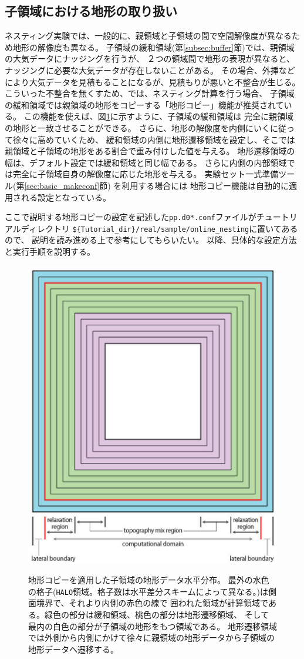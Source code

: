 \subsection{子領域における地形の取り扱い} \label{subsec:nest_topo}
ネスティング実験では、一般的に、親領域と子領域の間で空間解像度が異なるため地形の解像度も異なる。
子領域の緩和領域(第\ref{subsec:buffer}節)では、親領域の大気データにナッジングを行うが、
２つの領域間で地形の表現が異なると、ナッジングに必要な大気データが存在しないことがある。
その場合、外挿などにより大気データを見積もることになるが、見積もりが悪いと不整合が生じる。
%
こういった不整合を無くすため、\scalerm では、ネスティング計算を行う場合、
子領域の緩和領域では親領域の地形をコピーする「地形コピー」機能が推奨されている。
この機能を使えば、図\ref{fig_topocopy}に示すように、子領域の緩和領域は
完全に親領域の地形と一致させることができる。
さらに、地形の解像度を内側にいくに従って徐々に高めていくため、
緩和領域の内側に地形遷移領域を設定し、そこでは親領域と子領域の地形をある割合で重み付けした値を与える。
地形遷移領域の幅は、デフォルト設定では緩和領域と同じ幅である。
さらに内側の内部領域では完全に子領域自身の解像度に応じた地形を与える。
実験セット一式準備ツール(第\ref{sec:basic_makeconf}節) を利用する場合には
地形コピー機能は自動的に適用される設定となっている。


ここで説明する地形コピーの設定を記述した\verb|pp.d0*.conf|ファイルがチュートリアルディレクトリ
\verb|${Tutorial_dir}/real/sample/online_nesting|に置いてあるので、
説明を読み進める上で参考にしてもらいたい。
%
以降、具体的な設定方法と実行手順を説明する。


\begin{figure}[htb]
\begin{center}
  \includegraphics[width=0.4\hsize]{./figure/topo_copy.eps}\\
  \caption{地形コピーを適用した子領域の地形データ水平分布。
最外の水色の格子(\texttt{HALO}領域。格子数は水平差分スキームによって異なる。)は側面境界で、それより内側の赤色の線で
囲われた領域が計算領域である。緑色の部分は緩和領域、桃色の部分は地形遷移領域、
そして最内の白色の部分が子領域の地形をもつ領域である。
地形遷移領域では外側から内側にかけて徐々に親領域の地形データから子領域の地形データへ遷移する。}
  \label{fig_topocopy}
\end{center}
\end{figure}


